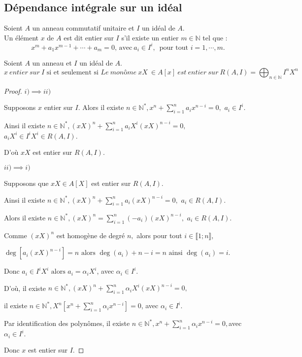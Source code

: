 \subsection{Dépendance intégrale sur un idéal}
\begin{madefinition}
	Soient $A$ un anneau commutatif unitaire et $I$ un idéal de $A$.\\ Un élément $x$ de $A$ est dit entier sur $I$ s'il existe un entier $m \in \mathbb{N}$ tel que : 
	\[ 	x^m + a_1 x^{m-1} + \cdots + a_m = 0\text{, avec} \ a_i \in I^i,\, \text{ pour tout } i=1, \cdots ,m. \]	
\end{madefinition}
\begin{maproposition}
	Soient $A$ un anneau et $I$ un idéal de $A$.
	\[ x \ entier \ sur \ I \text{ si et seulement si } Le \ monôme \ xX \ \in A[x] \ est \ entier \ sur \ R(A, I) = \displaystyle \bigoplus_{n \in \mathbb{N}}{I^nX^n} \]
\end{maproposition}
\begin{proof}
	$i) \implies ii)$
	
	Supposons $x$ entier sur $I.$ Alors il existe $n\in \mathbb{N}^{\ast },x^{n}+\sum\limits_{i=1}^{n}a_{i}x^{n-i}=0,$ $a_{i}\in I^{i}.$
	
	Ainsi il existe $n\in \mathbb{N}^{\ast },(xX)^{n}+\sum\limits_{i=1}^{n}a_{i}X^{i}(xX)^{n-i}=0,$ $
	a_{i}X^{i}\in I^{i}X^{i}\in R(A,I).$
	
	D’où $xX$ est entier sur $R(A,I).$
	
	$ii)\implies i)$
	
	Supposons que  $xX\in A[X]$ est entier sur $R(A,I).$
	
	Ainsi il existe $n\in \mathbb{N}^{\ast },(xX)^{n}+\sum\limits_{i=1}^{n}a_{i}(xX)^{n-i}=0,$ $a_{i}\in R(A,I).
	$
	
	Alors il existe $n\in \mathbb{N}^{\ast },(xX)^{n}=\sum\limits_{i=1}^{n}(-a_{i})(xX)^{n-i},$ $a_{i}\in
	R(A,I).$
	
	Comme $(xX)^{n}$ est homogène de degré $n,$ alors pour tout $i\in \llbracket 1; n \rrbracket,$
	
	$\deg [a_{i}(xX)^{n-i}]=n\text{ alors } \deg (a_{i})+n-i=n\text{ ainsi } \deg
	(a_{i})=i.$
	
	Donc $a_{i}\in I^{i}X^{i}\text{ alors } a_{i}=\alpha _{i}X^{i}$, avec $\alpha
	_{i}\in I^{i}.$
	
	D’où, il existe $n\in \mathbb{N}^{\ast },(xX)^{n}+\sum\limits_{i=1}^{n}\alpha _{i}X^{i}(xX)^{n-i}=0,$
	
	il existe $n\in \mathbb{N}^{\ast },X^{n}[x^{n}+\sum\limits_{i=1}^{n}\alpha _{i}x^{n-i}]=0$, avec $\alpha _{i}\in I^{i}.$
	
	Par identification des polynômes, il existe $n\in \mathbb{N}^{\ast },x^{n}+\sum\limits_{i=1}^{n}\alpha _{i}x^{n-i}=0,$avec $\alpha_{i}\in I^{i}.$
	
	Donc $x$ est entier sur $I.$
\end{proof}
